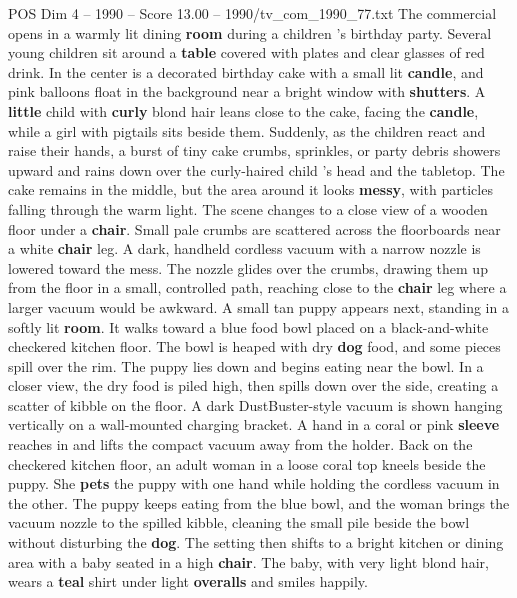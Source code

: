 \begin{textsample}{POS Dim 4 – 1990 – Score 13.00 – 1990/tv\_com\_1990\_77.txt}  \label{ex:f4_pos_078}
The commercial opens in a warmly lit dining \textbf{room} during a children ’s birthday party.
Several young children sit around a \textbf{table} covered with plates and clear glasses of red drink.
In the center is a decorated birthday cake with a small lit \textbf{candle}, and pink balloons float in the background near a bright window with \textbf{shutters}.
A \textbf{little} child with \textbf{curly} blond hair leans close to the cake, facing the \textbf{candle}, while a girl with pigtails sits beside them.
Suddenly, as the children react and raise their hands, a burst of tiny cake crumbs, sprinkles, or party debris showers upward and rains down over the curly-haired child ’s head and the tabletop.
The cake remains in the middle, but the area around it looks \textbf{messy}, with particles falling through the warm light.
The scene changes to a close view of a wooden floor under a \textbf{chair}.
Small pale crumbs are scattered across the floorboards near a white \textbf{chair} leg.
A dark, handheld cordless vacuum with a narrow nozzle is lowered toward the mess.
The nozzle glides over the crumbs, drawing them up from the floor in a small, controlled path, reaching close to the \textbf{chair} leg where a larger vacuum would be awkward.
A small tan puppy appears next, standing in a softly lit \textbf{room}.
It walks toward a blue food bowl placed on a black-and-white checkered kitchen floor.
The bowl is heaped with dry \textbf{dog} food, and some pieces spill over the rim.
The puppy lies down and begins eating near the bowl.
In a closer view, the dry food is piled high, then spills down over the side, creating a scatter of kibble on the floor.
A dark DustBuster-style vacuum is shown hanging vertically on a wall-mounted charging bracket.
A hand in a coral or pink \textbf{sleeve} reaches in and lifts the compact vacuum away from the holder.
Back on the checkered kitchen floor, an adult woman in a loose coral top kneels beside the puppy.
She \textbf{pets} the puppy with one hand while holding the cordless vacuum in the other.
The puppy keeps eating from the blue bowl, and the woman brings the vacuum nozzle to the spilled kibble, cleaning the small pile beside the bowl without disturbing the \textbf{dog}.
The setting then shifts to a bright kitchen or dining area with a baby seated in a high \textbf{chair}.
The baby, with very light blond hair, wears a \textbf{teal} shirt under light \textbf{overalls} and smiles happily.

\end{textsample}
